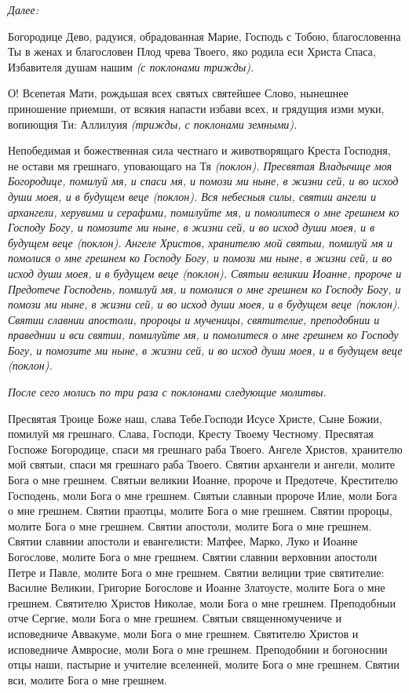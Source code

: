 \medskip\itshape Далее: \normalfont{}


Богородице Дево, радуися, обрадованная Марие, Господь с Тобою, благословенна Ты в женах и благословен Плод чрева Твоего, яко родила еси Христа Спаса, Избавителя душам нашим \itshape (с поклонами трижды)\normalfont{}.


О! Всепетая Мати, рождьшая всех святых святейшее Слово, нынешнее приношение приемши, от всякия напасти избави всех, и грядущия изми муки, вопиющия Ти: Аллилуия \itshape (трижды, с поклонами земными)\normalfont{}.


Непобедимая и божественная сила честнаго и животворящаго Креста Господня, не остави мя грешнаго, уповающаго на Тя \itshape (поклон)\normalfont{}. Пресвятая Владычице моя Богородице, помилуй мя, и спаси мя, и помози ми ныне, в жизни сей, и во исход души моея, и в будущем веце \itshape (поклон)\normalfont{}. Вся небесныя силы, святии ангели и архангели, херувими и серафими, помилуйте мя, и помолитеся о мне грешнем ко Господу Богу, и помозите ми ныне, в жизни сей, и во исход души моея, и в будущем веце \itshape (поклон)\normalfont{}. Ангеле Христов, хранителю мой святыи, помилуй мя и помолися о мне грешнем ко Господу Богу, и помози ми ныне, в жизни сей, и во исход души моея, и в будущем веце \itshape (поклон)\normalfont{}. Святыи великии Иоанне, пророче и Предотече Господень, помилуй мя, и помолися о мне грешнем ко Господу Богу, и помози ми ныне, в жизни сей, и во исход души моея, и в будущем веце \itshape (поклон)\normalfont{}. Святии славнии апостоли, пророцы и мученицы, святителие, преподобнии и праведнии и вси святии, помилуйте мя, и помолитеся о мне грешнем ко Господу Богу, и помозите ми ныне, в жизни сей, и во исход души моея, и в будущем веце \itshape (поклон)\normalfont{}. 


\medskip\itshape После сего молись по три раза с поклонами следующие молитвы.\normalfont{}


Пресвятая Троице Боже наш, слава Тебе.Господи Исусе Христе, Сыне Божии, помилуй мя грешнаго. Слава, Господи, Кресту Твоему Честному. Пресвятая Госпоже Богородице, спаси мя грешнаго раба Твоего. Ангеле Христов, хранителю мой святыи, спаси мя грешнаго раба Твоего. Святии архангели и ангели, молите Бога о мне грешнем. Святыи великии Иоанне, пророче и Предотече, Крестителю Господень, моли Бога о мне грешнем. Святыи славныи пророче Илие, моли Бога о мне грешнем. Святии праотцы, молите Бога о мне грешнем. Святии пророцы, молите Бога о мне грешнем. Святии апостоли, молите Бога о мне грешнем. Святии славнии апостоли и евангелисти: Матфее, Марко, Луко и Иоанне Богослове, молите Бога о мне грешнем. Святии славнии верховнии апостоли Петре и Павле, молите Бога о мне грешнем. Святии велиции трие святителие: Василие Великии, Григорие Богослове и Иоанне Златоусте, молите Бога о мне грешнем. Святителю Христов Николае, моли Бога о мне грешнем. Преподобныи отче Сергие, моли Бога о мне грешнем. Святыи священномучениче и исповедниче Аввакуме, моли Бога о мне грешнем. Святителю Христов и исповедниче Амвросие, моли Бога о мне грешнем. Преподобнии и богоноснии отцы наши, пастырие и учителие вселенней, молите Бога о мне грешнем. Святии вси, молите Бога о мне грешнем.


